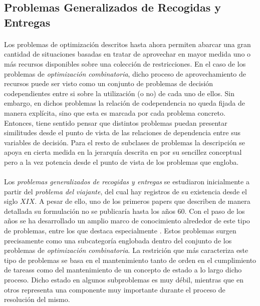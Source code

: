 \documentclass{subfiles}
\begin{document}
      \subsection{Problemas Generalizados de Recogidas y Entregas}
      \label{sec:formulation_generalized_pickup_and_delivery_problems}

        \paragraph{}
        Los problemas de optimización descritos hasta ahora permiten abarcar una gran cantidad de situaciones basadas en tratar de aprovechar en mayor medida uno o más recursos disponibles sobre una colección de restricciones. En el caso de los problemas de \emph{optimización combinatoria}, dicho proceso de aprovechamiento de recursos puede ser visto como un conjunto de problemas de decisión codependientes entre si sobre la utilización (o no) de cada uno de ellos. Sin embargo, en dichos problemas la relación de codependencia no queda fijada de manera explícita, sino que esta es marcada por cada problema concreto. Entonces, tiene sentido pensar que distintos problemas puedan presentar similitudes desde el punto de vista de las relaciones de dependencia entre sus variables de decisión. Para el resto de subclases de problemas la descripción se apoya en cierta medida en la jerarquía descrita en \cite{parragh2008survey} por su sencillez conceptual pero a la vez potencia desde el punto de vista de los problemas que engloba.

        \paragraph{}
        Los \emph{problemas generalizados de recogidas y entregas} se estudiaron inicialmente a partir del \emph{problema del viajante}, del cual hay registros de su existencia desde el siglo $XIX$. A pesar de ello, uno de los primeros papers que describen de manera detallada su formulación \cite{miller1960integer} no se publicaría hasta los años $60$. Con el paso de los años se ha desarrollado un amplio marco de conocimiento alrededor de este tipo de problemas, entre los que destaca especialmente \cite{toth2002vehicle}. Estos problemas surgen precisamente como una subcategoría englobada dentro del conjunto de los problemas de \emph{optimización combinatoria}. La restrición que más caracteriza este tipo de problemas se basa en el mantenimiento tanto de orden en el cumplimiento de tareass como del mantenimiento de un concepto de estado a lo largo dicho proceso. Dicho estado en algunos subproblemas es muy débil, mientras que en otros representa una componente muy importante durante el proceso de resolución del mismo.
\end{document}
